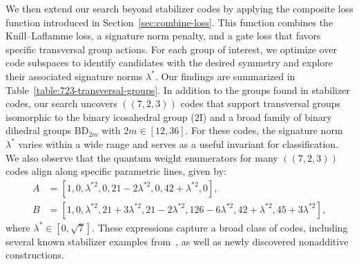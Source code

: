 \documentclass[8pt]{article}
\theoremstyle{definition}
\begin{document}
We then extend our search beyond stabilizer codes by applying the composite loss function introduced in Section~\ref{sec:combine-loss}. This function combines the Knill–Laflamme  loss, a signature norm penalty, and a gate loss that favors specific transversal group actions. For each group of interest, we optimize over code subspaces to identify candidates with the desired symmetry and explore their associated signature norms \(\lambda^*\). Our findings are summarized in Table~\ref{table:723-transversal-groups}. In addition to the groups found in stabilizer codes, our search uncovers \(((7,2,3))\) codes that support transversal groups isomorphic to the binary icosahedral group (\(2\mathrm{I}\)) \cite{kubischta2023family} and a broad family of binary dihedral groups \(\mathrm{BD}_{2m}\) with \(2m \in [12,36]\). For these codes, the signature norm \(\lambda^*\) varies within a wide range and serves as a useful invariant for classification. We also observe that the quantum weight enumerators for many \(((7,2,3))\) codes align along specific parametric lines, given by:
\begin{equation}\label{eq:723shorwt-line}
    \begin{aligned}
        A & = \left[1, 0, \lambda^{*2}, 0, 21 - 2\lambda^{*2}, 0, 42 + \lambda^{*2}, 0\right],                                                     \\
        B & = \left[1, 0, \lambda^{*2}, 21 + 3\lambda^{*2}, 21 - 2\lambda^{*2}, 126 - 6\lambda^{*2}, 42 + \lambda^{*2}, 45 + 3\lambda^{*2}\right],
    \end{aligned}
\end{equation}
where \(\lambda^* \in [0, \sqrt{7}]\). These expressions capture a broad class of codes, including several known stabilizer examples from~\cite{cross2025small}, as well as newly discovered nonadditive constructions.
\end{document}
